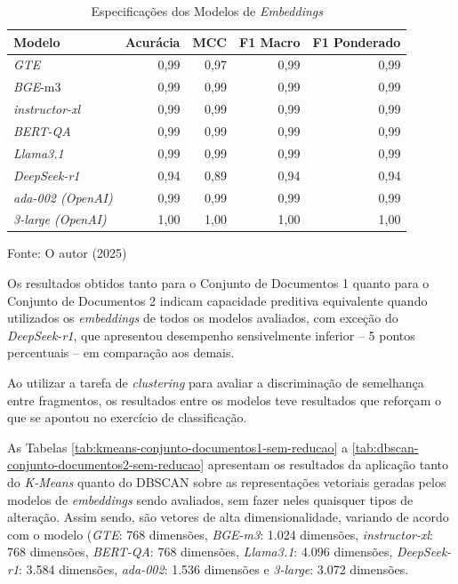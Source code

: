 \begin{table}[H]
    \caption{Especificações dos Modelos de \textit{Embeddings}}
    \centering
    \begin{tabular}{ l r r r r }
        \hline 
        \textbf{Modelo} & \textbf{Acurácia} & \textbf{MCC} & \textbf{F1 Macro} & \textbf{F1 Ponderado} \\
        \hline
        \textit{GTE} & 0,99 & 0,97 & 0,99 & 0,99 \\
        \textit{BGE}-m3 & 0,99 & 0,99 & 0,99 & 0,99 \\
        \textit{instructor-xl} & 0,99 & 0,99 & 0,99 & 0,99 \\
        \textit{BERT-QA} & 0,99 & 0,99 & 0,99 & 0,99 \\
        \textit{Llama3.1} & 0,99 & 0,99 & 0,99 & 0,99 \\
        \textit{DeepSeek-r1} & 0,94 & 0,89 & 0,94 & 0,94 \\
        \textit{ada-002 (OpenAI)} & 0,99 & 0,99 & 0,99 & 0,99 \\
        \textit{3-large (OpenAI)} & 1,00 & 1,00 & 1,00 & 1,00 \\
        \hline
    \end{tabular}
    
    Fonte: O autor (2025)
    \label{tab:scores-classificacao-2}
\end{table}

Os resultados obtidos tanto para o Conjunto de Documentos 1 quanto para o Conjunto de Documentos 2 indicam capacidade preditiva equivalente quando utilizados os \textit{embeddings} de todos os modelos avaliados, com exceção do \textit{DeepSeek-r1}, que apresentou desempenho sensivelmente inferior -- 5 pontos percentuais -- em comparação aos demais.

Ao utilizar a tarefa de \textit{clustering} para avaliar a discriminação de semelhança entre fragmentos, os resultados entre os modelos teve resultados que reforçam o que se apontou no exercício de classificação.

As Tabelas \ref{tab:kmeans-conjunto-documentos1-sem-reducao} a \ref{tab:dbscan-conjunto-documentos2-sem-reducao} apresentam os resultados da aplicação tanto do \textit{K-Means} quanto do DBSCAN sobre as representações vetoriais geradas pelos modelos de \textit{embeddings} sendo avaliados, sem fazer neles quaisquer tipos de alteração. Assim sendo, são vetores de alta dimensionalidade, variando de acordo com o modelo (\textit{GTE}: 768 dimensões, \textit{BGE-m3}: 1.024 dimensões, \textit{instructor-xl}: 768 dimensões, \textit{BERT-QA}: 768 dimensões, \textit{Llama3.1}: 4.096 dimensões, \textit{DeepSeek-r1}: 3.584 dimensões, \textit{ada-002}: 1.536 dimensões e \textit{3-large}: 3.072 dimensões.

